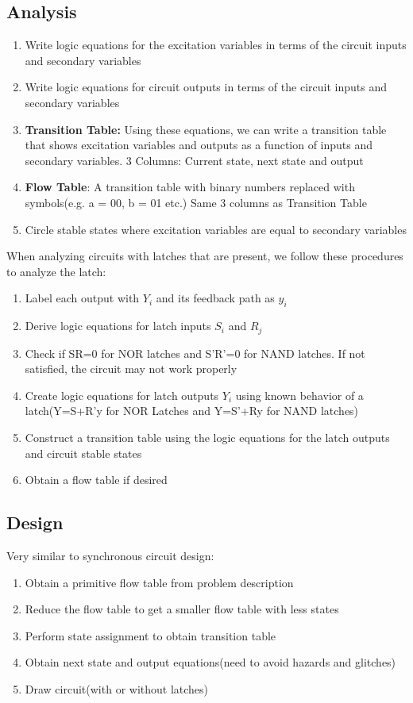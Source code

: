 \documentclass[12pt]{report}
\begin{document}
		\subsection{Analysis}
			\begin{enumerate}
				\item Write logic equations for the excitation variables in terms of the circuit inputs and secondary variables
				\item Write logic equations for circuit outputs in terms of the circuit inputs and secondary variables
				\item \textbf{Transition Table:} Using these equations, we can write a transition table that shows excitation variables and outputs as a function of inputs and secondary variables. 3 Columns: Current state, next state and output
				\item \textbf{Flow Table}: A transition table with binary numbers replaced with symbols(e.g. a = 00, b = 01 etc.) Same 3 columns as Transition Table
				\item Circle stable states where excitation variables are equal to secondary variables
			\end{enumerate}
			When analyzing circuits with latches that are present, we follow these procedures to analyze the latch:
			\begin{enumerate}
				\item Label each output with $Y_i$ and its feedback path as $y_i$
				\item Derive logic equations for latch inputs $S_i$ and $R_j$
				\item Check if SR=0 for NOR latches and S'R'=0 for NAND latches. If not satisfied, the circuit may not work properly
				\item Create logic equations for latch outputs $Y_i$ using known behavior of a latch(Y=S+R'y for NOR Latches and Y=S'+Ry for NAND latches)
				\item Construct a transition table using the logic equations for the latch outputs and circuit stable states
				\item Obtain a flow table if desired 
			\end{enumerate}
		\subsection{Design}
			Very similar to synchronous circuit design:\\
			\begin{enumerate}
				\item Obtain a primitive flow table from problem description
				\item Reduce the flow table to get a smaller flow table with less states
				\item Perform state assignment to obtain transition table
				\item Obtain next state and output equations(need to avoid hazards and glitches)
				\item Draw circuit(with or without latches)
			\end{enumerate}
\end{document}
